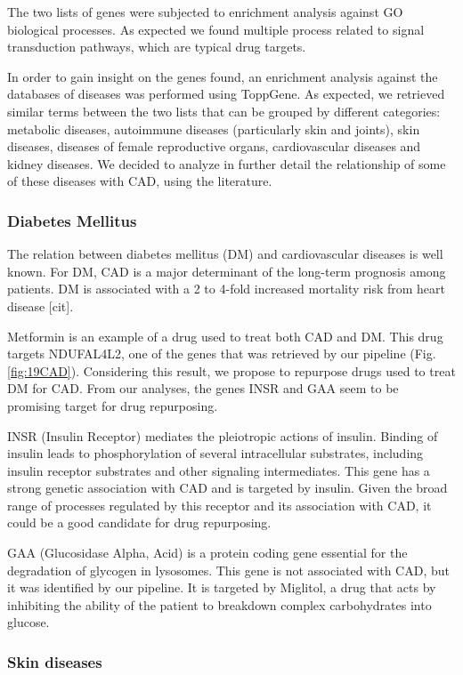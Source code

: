 \documentclass[fleqn,10pt]{SelfArx} %
\begin{document}
The two lists of genes were subjected to enrichment analysis against GO biological processes. As expected we found multiple process related to signal transduction pathways, which are typical drug targets.

In order to gain insight on the genes found, an enrichment analysis against the databases of diseases was performed using ToppGene. As expected, we retrieved similar terms between the two lists that can be grouped by different categories: metabolic diseases, autoimmune diseases (particularly skin and joints), skin diseases, diseases of female reproductive organs, cardiovascular diseases and kidney diseases. We decided to analyze in further detail the relationship of some of these diseases with CAD, using the literature.

\subsubsection*{Diabetes Mellitus}

The relation between diabetes mellitus (DM) and cardiovascular diseases is well known. For DM, CAD is a major determinant of the long-term prognosis among patients. DM is associated with a 2 to 4-fold increased mortality risk from heart disease [cit].

Metformin is an example of a drug used to treat both CAD and DM. This drug targets NDUFAL4L2, one of the genes that was retrieved by our pipeline (Fig. \ref{fig:19CAD}). Considering this result, we propose to repurpose drugs used to treat DM for CAD. From our analyses, the genes INSR and GAA seem to be promising target for drug repurposing.

INSR (Insulin Receptor) mediates the pleiotropic actions of insulin. Binding of insulin leads to phosphorylation of several intracellular substrates, including insulin receptor substrates and other signaling intermediates. This gene has a strong  genetic association with CAD and is targeted by insulin. Given the broad range of processes regulated by this receptor and its association with CAD, it could be a good candidate for drug repurposing.

GAA  (Glucosidase Alpha, Acid) is a protein coding gene essential for the degradation of glycogen in lysosomes. This gene is not associated with CAD, but it was identified by our pipeline. It is targeted by Miglitol, a drug that acts by inhibiting the ability of the patient to breakdown complex carbohydrates into glucose.

\subsubsection*{Skin diseases}
\end{document}

